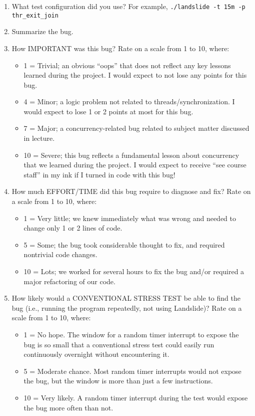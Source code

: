 \documentclass{article}
\begin{document}
\begin{enumerate}
	\item What test configuration did you use? For example, {\tt ./landslide -t 15m -p thr\_exit\_join}
		\vspace{0.5in}
	\item Summarize the bug.
		\vspace{0.5in}
	\item How IMPORTANT was this bug? Rate on a scale from 1 to 10, where:
		\begin{itemize}
			\item 1 = Trivial; an obvious ``oops'' that does not reflect any key lessons learned during the project. I would expect to not lose any points for this bug.
			\item 4 = Minor; a logic problem not related to threads/synchronization. I would expect to lose 1 or 2 points at most for this bug.
			\item 7 = Major; a concurrency-related bug related to subject matter discussed in lecture.
			\item 10 = Severe; this bug reflects a fundamental lesson about concurrency that we learned during the project. I would expect to receive ``see course staff'' in my ink if I turned in code with this bug!
		\end{itemize}
		\vspace{0.5in}
	\item How much EFFORT/TIME did this bug require to diagnose and fix? Rate on a scale from 1 to 10, where:
		\begin{itemize}
			\item 1 = Very little; we knew immediately what was wrong and needed to change only 1 or 2 lines of code.
			\item 5 = Some; the bug took considerable thought to fix, and required nontrivial code changes.
			\item 10 = Lots; we worked for several hours to fix the bug and/or required a major refactoring of our code.
		\end{itemize}
		\vspace{0.5in}
	\item How likely would a CONVENTIONAL STRESS TEST be able to find the bug (i.e., running the program repeatedly, not using Landslide)? Rate on a scale from 1 to 10, where:
		\begin{itemize}
			\item 1 = No hope. The window for a random timer interrupt to expose the bug is so small that a conventional stress test could easily run continuously overnight without encountering it.
			\item 5 = Moderate chance. Most random timer interrupts would not expose the bug, but the window is more than just a few instructions.
			\item 10 = Very likely. A random timer interrupt during the test would expose the bug more often than not.
		\end{itemize}
\end{enumerate}
\end{document}
